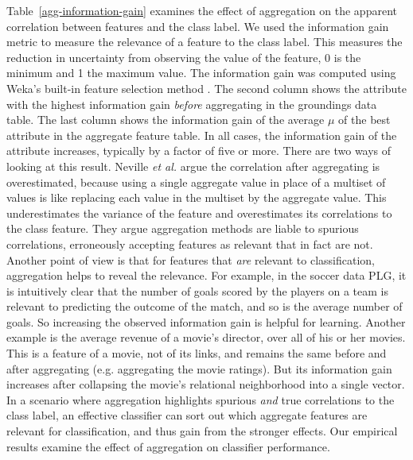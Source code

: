 \documentclass[conference]{IEEEtran}
\begin{document}
Table~\ref{agg-information-gain} examines the effect of aggregation on the apparent correlation between features and the class label. We used the information gain metric to measure the relevance of a feature to the class label. This measures the reduction in uncertainty from observing the value of the feature, 0 is the minimum and 1 the maximum value. The information gain was computed using Weka's built-in feature selection method \cite{Hall2009}. The second column shows the attribute with the highest information gain {\em before} aggregating in the groundings data table. The last column  shows the information gain of the average $\mu$ of the best attribute in the aggregate feature table. In all cases, the information gain of the attribute increases, typically by a factor of five or more. There are two ways of looking at this result. Neville {\em et al.} \cite{Jensen2003,jensen-auto,Neville2003} argue the correlation after aggregating is overestimated, because using a single aggregate value in place of a multiset of values is like replacing each value in the multiset by the aggregate value. This underestimates the variance of the feature and overestimates its correlations to the class feature. They argue aggregation methods are liable to spurious correlations, erroneously accepting features as relevant that in fact are not. Another point of view is that for features that {\em are} relevant to classification, aggregation helps to reveal the relevance. For example, in the soccer data PLG, it is intuitively clear that the number of goals scored by the players on a team is relevant to predicting the outcome of the match, and so is the average number of goals. So increasing the observed information gain is helpful for learning. Another example is the average revenue of a movie's director, over all of his or her movies. This is a feature of a movie, not of its links, and remains the same before and after aggregating (e.g. aggregating the movie ratings). But its information gain increases after collapsing the movie's relational neighborhood into a single vector. In a scenario where aggregation highlights  spurious {\em and} true correlations to the class label, an effective classifier can sort out which aggregate features are relevant for classification, and thus gain from the stronger effects. Our empirical results examine the effect of aggregation on classifier performance.
\end{document}
